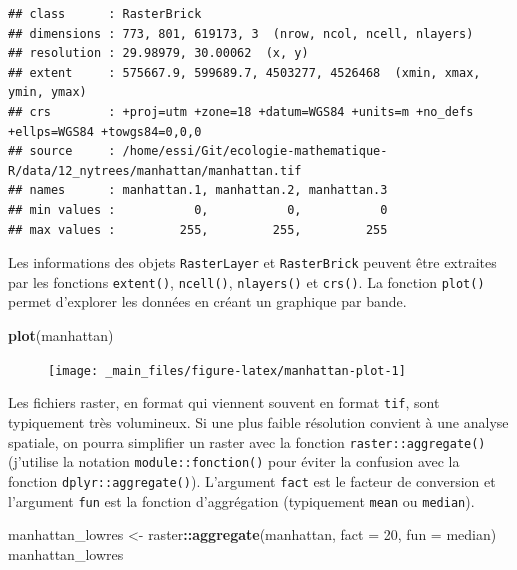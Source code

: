 \documentclass[]{book}
\newenvironment{Shaded}{\begin{snugshade}}{\end{snugshade}}
\newcommand{\DataTypeTok}[1]{\textcolor[rgb]{0.13,0.29,0.53}{#1}}
\newcommand{\DecValTok}[1]{\textcolor[rgb]{0.00,0.00,0.81}{#1}}
\newcommand{\KeywordTok}[1]{\textcolor[rgb]{0.13,0.29,0.53}{\textbf{#1}}}
\newcommand{\NormalTok}[1]{#1}
\newcommand{\OperatorTok}[1]{\textcolor[rgb]{0.81,0.36,0.00}{\textbf{#1}}}
\newcommand{\StringTok}[1]{\textcolor[rgb]{0.31,0.60,0.02}{#1}}
\begin{document}
\begin{verbatim}
## class      : RasterBrick 
## dimensions : 773, 801, 619173, 3  (nrow, ncol, ncell, nlayers)
## resolution : 29.98979, 30.00062  (x, y)
## extent     : 575667.9, 599689.7, 4503277, 4526468  (xmin, xmax, ymin, ymax)
## crs        : +proj=utm +zone=18 +datum=WGS84 +units=m +no_defs +ellps=WGS84 +towgs84=0,0,0 
## source     : /home/essi/Git/ecologie-mathematique-R/data/12_nytrees/manhattan/manhattan.tif 
## names      : manhattan.1, manhattan.2, manhattan.3 
## min values :           0,           0,           0 
## max values :         255,         255,         255
\end{verbatim}

Les informations des objets \texttt{RasterLayer} et \texttt{RasterBrick}
peuvent être extraites par les fonctions \texttt{extent()},
\texttt{ncell()}, \texttt{nlayers()} et \texttt{crs()}. La fonction
\texttt{plot()} permet d'explorer les données en créant un graphique par
bande.

\begin{Shaded}
\begin{Highlighting}[]
\KeywordTok{plot}\NormalTok{(manhattan)}
\end{Highlighting}
\end{Shaded}

\begin{figure}

{\centering \texttt{[image: \_main\_files/figure-latex/manhattan-plot-1]} 

}

\caption{ }\label{fig:manhattan-plot}
\end{figure}

Les fichiers raster, en format qui viennent souvent en format
\texttt{tif}, sont typiquement très volumineux. Si une plus faible
résolution convient à une analyse spatiale, on pourra simplifier un
raster avec la fonction \texttt{raster::aggregate()} (j'utilise la
notation \texttt{module::fonction()} pour éviter la confusion avec la
fonction \texttt{dplyr::aggregate()}). L'argument \texttt{fact} est le
facteur de conversion et l'argument \texttt{fun} est la fonction
d'aggrégation (typiquement \texttt{mean} ou \texttt{median}).

\begin{Shaded}
\begin{Highlighting}[]
\NormalTok{manhattan_lowres <-}\StringTok{ }\NormalTok{raster}\OperatorTok{::}\KeywordTok{aggregate}\NormalTok{(manhattan, }\DataTypeTok{fact =} \DecValTok{20}\NormalTok{, }\DataTypeTok{fun =}\NormalTok{ median)}
\NormalTok{manhattan_lowres}
\end{Highlighting}
\end{Shaded}
\end{document}
